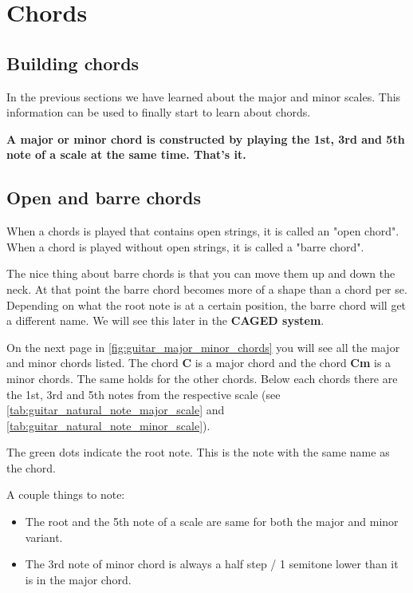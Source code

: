 \section{Chords}

\subsection{Building chords}
In the previous sections we have learned about the major and minor scales. This information can be used to finally start to learn about chords.

\textbf{A major or minor chord is constructed by playing the 1st, 3rd and 5th note of a scale at the same time. That's it.}

\subsection{Open and barre chords}

When a chords is played that contains open strings, it is called an "open chord". When a chord is played without open strings, it is called a "barre chord".

The nice thing about barre chords is that you can move them up and down the neck. At that point the barre chord becomes more of a shape than a chord per se. Depending on what the root note is at a certain position, the barre chord will get a different name. We will see this later in the \textbf{CAGED system}.

On the next page in \autoref{fig:guitar_major_minor_chords} you will see all the major and minor chords listed. The chord \textbf{C} is a major chord and the chord \textbf{Cm} is a minor chords. The same holds for the other chords. Below each chords there are the 1st, 3rd and 5th notes from the respective scale (see \autoref{tab:guitar_natural_note_major_scale} and \autoref{tab:guitar_natural_note_minor_scale}).

The green dots indicate the root note. This is the note with the same name as the chord.

A couple things to note:

\begin{itemize}
	\item The root and the 5th note of a scale are same for both the major and minor variant.
	\item The 3rd note of minor chord is always a half step / 1 semitone lower than it is in the major chord.
\end{itemize}

